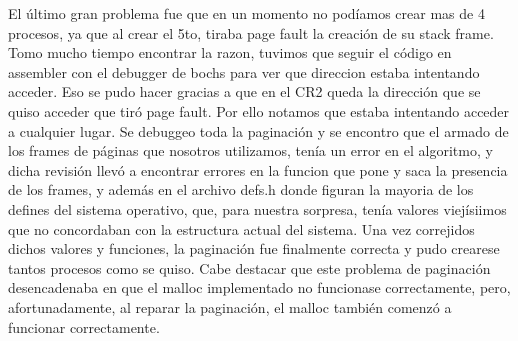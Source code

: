 \documentclass[10pt,a4paper]{article}
\begin{document}
El \'ultimo gran problema fue que en un momento no pod\'iamos crear mas de 4 procesos, ya que al crear el 5to, tiraba page fault la creaci\'on de su stack frame. Tomo mucho tiempo encontrar la razon, tuvimos que seguir el c\'odigo en assembler con el debugger de bochs para ver que direccion estaba intentando acceder. Eso se pudo hacer gracias a que en el CR2 queda la direcci\'on que se quiso acceder que tir\'o page fault. Por ello notamos que estaba intentando acceder a cualquier lugar. Se debuggeo toda la paginaci\'on y se encontro que el armado de los frames de p\'aginas que nosotros utilizamos, ten\'ia un error en el algoritmo, y dicha revisi\'on llev\'o a encontrar errores en la funcion que pone y saca la presencia de los frames, y adem\'as en el archivo defs.h donde figuran la mayoria de los defines del sistema operativo, que, para nuestra sorpresa, ten\'ia valores viej\'isiimos que no concordaban con la estructura actual del sistema. Una vez correjidos dichos valores y funciones, la paginaci\'on fue finalmente correcta y pudo crearese tantos procesos como se quiso. Cabe destacar que este problema de paginaci\'on desencadenaba en que el malloc implementado no funcionase correctamente, pero, afortunadamente, al reparar la paginaci\'on, el malloc tambi\'en comenz\'o a funcionar correctamente.

\newpage
\end{document}
